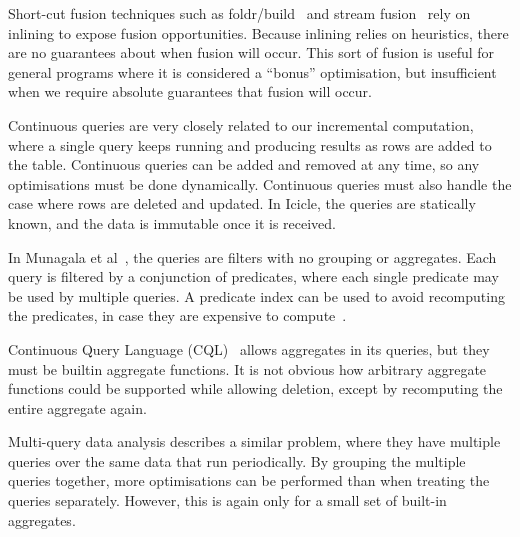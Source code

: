 Short-cut fusion techniques such as foldr/build~\cite{gill1993short} and stream fusion~\cite{coutts2007stream} rely on inlining to expose fusion opportunities.
Because inlining relies on heuristics, there are no guarantees about when fusion will occur.
This sort of fusion is useful for general programs where it is considered a ``bonus'' optimisation, but insufficient when we require absolute guarantees that fusion will occur.


Continuous queries are very closely related to our incremental computation, where a single query keeps running and producing results as rows are added to the table.
Continuous queries can be added and removed at any time, so any optimisations must be done dynamically.
Continuous queries must also handle the case where rows are deleted and updated.
In Icicle, the queries are statically known, and the data is immutable once it is received.

In Munagala et al~\cite{munagala2007optimization}, the queries are filters with no grouping or aggregates.
Each query is filtered by a conjunction of predicates, where each single predicate may be used by multiple queries.
A predicate index can be used to avoid recomputing the predicates, in case they are expensive to compute~\cite{madden2002continuously}.

Continuous Query Language (CQL)~\cite{arasu2002abstract,stream2003stream} allows aggregates in its queries, but they must be builtin aggregate functions.
It is not obvious how arbitrary aggregate functions could be supported while allowing deletion, except by recomputing the entire aggregate again.

Multi-query data analysis\cite{andrade2003efficient} describes a similar problem, where they have multiple queries over the same data that run periodically.
By grouping the multiple queries together, more optimisations can be performed than when treating the queries separately.
However, this is again only for a small set of built-in aggregates.


